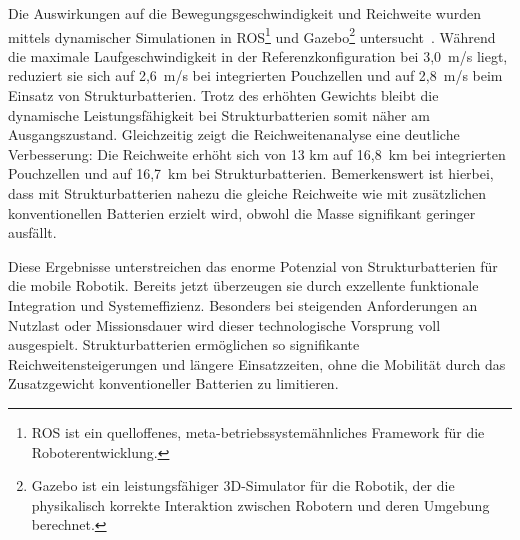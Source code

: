 Die Auswirkungen auf die Bewegungsgeschwindigkeit und Reichweite wurden mittels dynamischer Simulationen in ROS\footnote{ROS ist ein quelloffenes, meta-betriebssystemähnliches Framework für die Roboterentwicklung.} und Gazebo\footnote{Gazebo ist ein leistungsfähiger 3D-Simulator für die Robotik, der die physikalisch korrekte Interaktion zwischen Robotern und deren Umgebung berechnet.} untersucht~\cite{ROS2, Gazebo}. Während die maximale Laufgeschwindigkeit in der Referenzkonfiguration bei 3,0~m/s liegt, reduziert sie sich auf 2,6~m/s bei integrierten Pouchzellen und auf 2,8~m/s beim Einsatz von Strukturbatterien. Trotz des erhöhten Gewichts bleibt die dynamische Leistungsfähigkeit bei Strukturbatterien somit näher am Ausgangszustand. Gleichzeitig zeigt die Reichweitenanalyse eine deutliche Verbesserung: Die Reichweite erhöht sich von 13 km auf 16,8~km bei integrierten Pouchzellen und auf 16,7~km bei Strukturbatterien. Bemerkenswert ist hierbei, dass mit Strukturbatterien nahezu die gleiche Reichweite wie mit zusätzlichen konventionellen Batterien erzielt wird, obwohl die Masse signifikant geringer ausfällt.

Diese Ergebnisse unterstreichen das enorme Potenzial von Strukturbatterien für die mobile Robotik. Bereits jetzt überzeugen sie durch exzellente funktionale Integration und Systemeffizienz. Besonders bei steigenden Anforderungen an Nutzlast oder Missionsdauer wird dieser technologische Vorsprung voll ausgespielt. Strukturbatterien ermöglichen so signifikante Reichweitensteigerungen und längere Einsatzzeiten, ohne die Mobilität durch das Zusatzgewicht konventioneller Batterien zu limitieren.